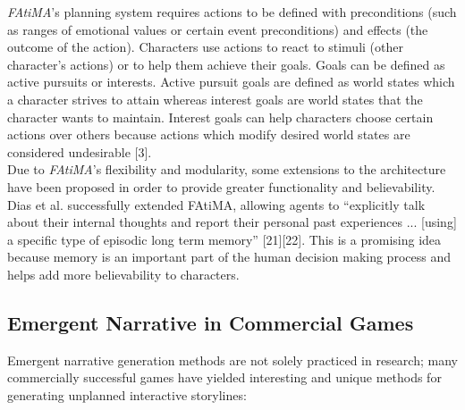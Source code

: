 \documentclass{sig-alternate-05-2015}
\begin{document}
\textit{FAtiMA}'s planning system requires actions to be defined with preconditions (such as ranges of emotional values or certain event preconditions) and effects (the outcome of the action). Characters use actions to react to stimuli (other character's actions) or to help them achieve their goals. Goals can be defined as active pursuits or interests. Active pursuit goals are defined as world states which a character strives to attain whereas interest goals are world states that the character wants to maintain. Interest goals can help characters choose certain actions over others because actions which modify desired world states are considered undesirable [3].\\

Due to \textit{FAtiMA}'s flexibility and modularity, some extensions to the architecture have been proposed in order to provide greater functionality and believability. Dias et al. successfully extended FAtiMA, allowing agents to ``explicitly talk about their internal thoughts and report their personal past experiences ... [using] a specific type of episodic long term memory'' [21][22]. This is a promising idea because memory is an important part of the human decision making process and helps add more believability to characters.

\subsection{Emergent Narrative in Commercial Games}
Emergent narrative generation methods are not solely practiced in research; many commercially successful games have yielded interesting and unique methods for generating unplanned interactive storylines:
\end{document}

